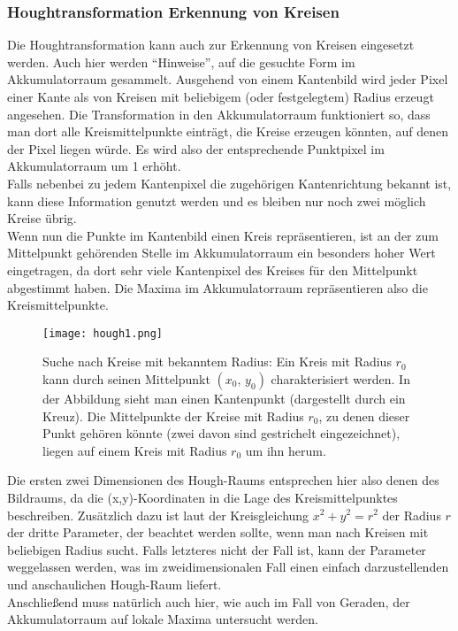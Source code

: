 			
		\subsubsection{Houghtransformation Erkennung von Kreisen}
Die Houghtransformation \cite{Hart2009} kann auch zur Erkennung von Kreisen eingesetzt werden. Auch hier werden "`Hinweise"', auf die gesuchte Form im Akkumulatorraum gesammelt. 
Ausgehend von einem Kantenbild wird jeder Pixel einer Kante als von Kreisen mit beliebigem (oder festgelegtem) Radius erzeugt angesehen. Die Transformation in den Akkumulatorraum funktioniert so, dass man dort alle Kreismittelpunkte einträgt, die Kreise erzeugen könnten, auf denen der Pixel liegen würde. Es wird also der entsprechende Punktpixel im Akkumulatorraum um 1 erhöht. \\
Falls nebenbei zu jedem Kantenpixel die zugehörigen Kantenrichtung bekannt  ist, kann diese Information genutzt werden und es bleiben nur noch zwei möglich Kreise übrig.\\
Wenn nun die Punkte im Kantenbild einen Kreis repräsentieren, ist an der zum Mittelpunkt gehörenden Stelle im Akkumulatorraum ein besonders hoher Wert eingetragen, da dort sehr viele Kantenpixel des Kreises für den Mittelpunkt abgestimmt haben. Die Maxima im Akkumulatorraum repräsentieren also die Kreismittelpunkte.

\begin{figure}[H]
  \begin{center}
    \texttt{[image: hough1.png]}
    \caption{Suche nach Kreise mit bekanntem Radius: \newline
Ein Kreis mit Radius $r_0$ kann durch seinen Mittelpunkt $(x_0,\,y_0)$ charakterisiert werden.
In der Abbildung sieht man einen Kantenpunkt (dargestellt durch ein Kreuz). Die Mittelpunkte der Kreise mit Radius $r_0$, zu denen dieser Punkt gehören könnte (zwei davon sind gestrichelt eingezeichnet), liegen auf einem Kreis mit Radius $r_0$ um ihn herum.}
    \label{fig:akku_projection1}
  \end{center}
\end{figure}

Die ersten zwei Dimensionen des Hough-Raums entsprechen hier also denen des Bildraums, da die (x,y)-Koordinaten in die Lage des Kreismittelpunktes beschreiben. Zusätzlich dazu ist laut der Kreisgleichung $x^2 + y^2 = r^2$ der Radius $r$ der dritte Parameter, der beachtet werden sollte, wenn man nach Kreisen mit beliebigen Radius sucht. Falls letzteres nicht der Fall ist, kann der Parameter weggelassen werden, was im zweidimensionalen Fall einen einfach darzustellenden und anschaulichen Hough-Raum liefert. \\
Anschließend muss natürlich auch hier, wie auch im Fall von Geraden, der Akkumulatorraum auf lokale Maxima untersucht werden.